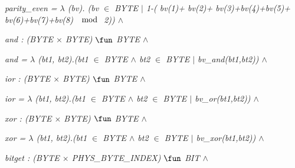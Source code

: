 \hspace*{0.20in}\it parity\_even \rm =  $\lambda$  \rm (\it bv\rm )\rm . \rm (\it bv  $\in$  \it BYTE  $\mid$  \rm 1\rm -\rm ( \it bv\rm (\rm 1\rm )\rm + \it bv\rm (\rm 2\rm )\rm + \it bv\rm (\rm 3\rm )\rm +\it bv\rm (\rm 4\rm )\rm +\it bv\rm (\rm 5\rm )\rm + \it bv\rm (\rm 6\rm )\rm +\it bv\rm (\rm 7\rm )\rm +\it bv\rm (\rm 8\rm )  $\mod$  \rm 2\rm )\rm )  $\land$ 

\hspace*{0.20in}

\hspace*{0.20in}\it and \rm : \rm (\it BYTE  $\times$  \it BYTE\rm )  $\fun$  \it BYTE  $\land$ 

\hspace*{0.20in}\it and \rm =  $\lambda$ \rm (\it bt1\rm , \it bt2\rm )\rm .\rm (\it bt1 $\in$ \it BYTE  $\land$  \it bt2 $\in$ \it BYTE  $\mid$  \it bv\_and\rm (\it bt1\rm ,\it bt2\rm )\rm )  $\land$ 

\hspace*{0.20in}

\hspace*{0.20in}\it ior \rm : \rm (\it BYTE  $\times$  \it BYTE\rm )  $\fun$  \it BYTE  $\land$  

\hspace*{0.20in}\it ior \rm =  $\lambda$ \rm (\it bt1\rm , \it bt2\rm )\rm .\rm (\it bt1 $\in$ \it BYTE  $\land$  \it bt2 $\in$ \it BYTE  $\mid$  \it bv\_or\rm (\it bt1\rm ,\it bt2\rm )\rm )\hspace*{0.15in} $\land$  

\hspace*{0.20in}

\hspace*{0.20in}\it xor \rm : \rm (\it BYTE  $\times$  \it BYTE\rm )  $\fun$  \it BYTE  $\land$ 

\hspace*{0.20in}\it xor \rm =  $\lambda$ \rm (\it bt1\rm , \it bt2\rm )\rm .\rm (\it bt1  $\in$  \it BYTE  $\land$  \it bt2  $\in$  \it BYTE  $\mid$  \it bv\_xor\rm (\it bt1\rm ,\it bt2\rm )\rm )  $\land$ 

\hspace*{0.20in}

\hspace*{0.20in}

\hspace*{0.20in}\it bitget \rm : \rm (\it BYTE  $\times$  \it PHYS\_BYTE\_INDEX\rm )  $\fun$  \it BIT  $\land$  

 

